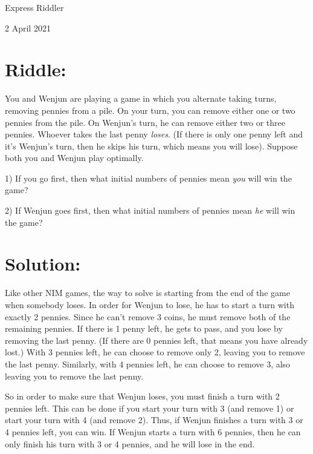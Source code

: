 \documentclass{article}
\begin{document}
\pagestyle{empty} %

\begin{center}
{\LARGE Express Riddler}

\vspace{0.15in}

{\Large 2 April 2021}
\end{center}


\section*{Riddle:}

You and Wenjun are playing a game in which you alternate taking turns, removing pennies from a pile.
On your turn, you can remove either one or two pennies from the pile.
On Wenjun's turn, he can remove either two or three pennies.
Whoever takes the last penny \textit{loses}.
(If there is only one penny left and it's Wenjun's turn, then he skips his turn, which means you will lose).
Suppose both you and Wenjun play optimally.

1) If you go first, then what initial numbers of pennies mean \textit{you} will win the game?

2) If Wenjun goes first, then what initial numbers of pennies mean \textit{he} will win the game?



\section*{Solution:}

Like other NIM games, the way to solve is starting from the end of the game when somebody loses.
In order for Wenjun to lose, he has to start a turn with exactly 2 pennies.
Since he can't remove 3 coins, he must remove both of the remaining pennies.
If there is 1 penny left, he gets to pass, and you lose by removing the last penny.
(If there are 0 pennies left, that means you have already lost.)
With 3 pennies left, he can choose to remove only 2, leaving you to remove the last penny.
Similarly, with 4 pennies left, he can choose to remove 3, also leaving you to remove the last penny.

So in order to make sure that Wenjun loses, you must finish a turn with 2 pennies left.
This can be done if you start your turn with 3 (and remove 1) or start your turn with 4 (and remove 2).
Thus, if Wenjun finishes a turn with 3 or 4 pennies left, you can win.
If Wenjun starts a turn with 6 pennies, then he can only finish his turn with 3 or 4 pennies, and he will lose in the end.
\end{document}
